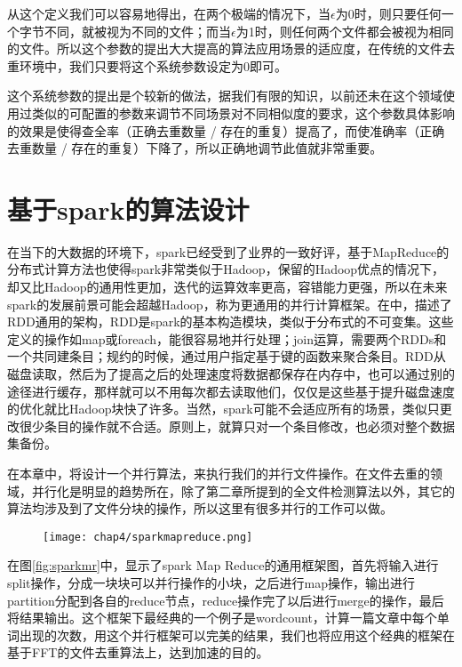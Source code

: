 从这个定义我们可以容易地得出，在两个极端的情况下，当$\epsilon$为0时，则只要任何一个字节不同，就被视为不同的文件；而当$\epsilon$为1时，则任何两个文件都会被视为相同的文件。所以这个参数的提出大大提高的算法应用场景的适应度，在传统的文件去重环境中，我们只要将这个系统参数设定为$0$即可。

这个系统参数的提出是个较新的做法，据我们有限的知识，以前还未在这个领域使用过类似的可配置的参数来调节不同场景对不同相似度的要求，这个参数具体影响的效果是使得查全率（正确去重数量 / 存在的重复）提高了，而使准确率（正确去重数量 / 存在的重复）下降了，所以正确地调节此值就非常重要。

\section{基于spark的算法设计}
\label{sec:spark}

在当下的大数据的环境下，spark已经受到了业界的一致好评，基于MapReduce的分布式计算方法也使得spark非常类似于Hadoop，保留的Hadoop优点的情况下，却又比Hadoop的通用性更加，迭代的运算效率更高，容错能力更强，所以在未来spark的发展前景可能会超越Hadoop，称为更通用的并行计算框架。在\cite{zaharia2012resilient}中，描述了RDD通用的架构，RDD是spark的基本构造模块，类似于分布式的不可变集。这些定义的操作如map或foreach，能很容易地并行处理；join运算，需要两个RDDs和一个共同建条目；规约的时候，通过用户指定基于键的函数来聚合条目。RDD从磁盘读取，然后为了提高之后的处理速度将数据都保存在内存中，也可以通过别的途径进行缓存，那样就可以不用每次都去读取他们，仅仅是这些基于提升磁盘速度的优化就比Hadoop块快了许多。当然，spark可能不会适应所有的场景，类似只更改很少条目的操作就不合适。原则上，就算只对一个条目修改，也必须对整个数据集备份。

在本章中，将设计一个并行算法，来执行我们的并行文件操作。在文件去重的领域，并行化是明显的趋势所在，除了第二章所提到的全文件检测算法以外，其它的算法均涉及到了文件分块的操作，所以这里有很多并行的工作可以做。

\begin{figure}[!h]
    \begin{minipage}[b]{1\textwidth}
    \captionstyle{\centering}
    \centering
    \texttt{[image: chap4/sparkmapreduce.png]}
    \end{minipage}     
\end{figure}

在图\ref{fig:sparkmr}中，显示了spark Map Reduce的通用框架图，首先将输入进行split操作，分成一块块可以并行操作的小块，之后进行map操作，输出进行partition分配到各自的reduce节点，reduce操作完了以后进行merge的操作，最后将结果输出。这个框架下最经典的一个例子是wordcount，计算一篇文章中每个单词出现的次数，用这个并行框架可以完美的结果，我们也将应用这个经典的框架在基于FFT的文件去重算法上，达到加速的目的。

